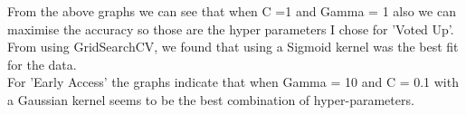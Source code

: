 \documentclass[11pt]{article} %
\begin{document}
\begin{figure}[h]
\centering
{}
\qquad
{}
\end{figure}

From the above graphs we can see that when C =1 and Gamma = 1 also we can maximise the accuracy so those are the hyper parameters I chose for 'Voted Up'.  From using GridSearchCV,  we found that using a Sigmoid kernel was the best fit for the data. 
\\ For 'Early Access' the graphs indicate that when Gamma = 10 and C = 0.1 with a Gaussian kernel seems to be the best combination of hyper-parameters. 
\end{document}
